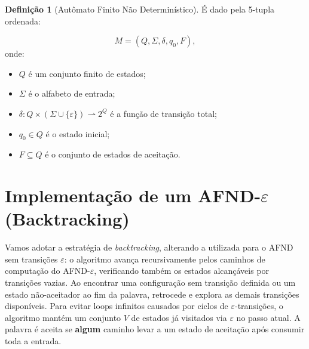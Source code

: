 \documentclass[12pt, a4paper]{article}
\theoremstyle{definition}
\newtheorem{definition}{Definição}[section]
\theoremstyle{plain}
\theoremstyle{remark}
\begin{document}
\begin{definition}[Autômato Finito Não Determinístico]
É dado pela 5-tupla ordenada:

\[
M = (Q, \Sigma, \delta, q_0, F),
\]
onde:

\begin{itemize}
    \item $Q$ é um conjunto finito de estados;
    \item $\Sigma$ é o alfabeto de entrada;
    \item $\delta : Q \times (\Sigma \cup \{\varepsilon\}) \rightharpoonup 2^{Q}$ é a função de transição total;
    \item $q_0 \in Q$ é o estado inicial;
    \item $F \subseteq Q$ é o conjunto de estados de aceitação.
\end{itemize}

\end{definition}

\section{Implementação de um AFND-$\varepsilon$ (Backtracking)}
Vamos adotar a estratégia de \textit{backtracking}, alterando a utilizada para
o AFND sem transições $\varepsilon$: o algoritmo avança recursivamente pelos
caminhos de computação do AFND-$\varepsilon$, verificando também os estados
alcançáveis por transições vazias. Ao encontrar uma configuração sem transição
definida ou um estado não-aceitador ao fim da palavra, retrocede e explora as
demais transições disponíveis. Para evitar loops infinitos causados por ciclos
de $\varepsilon$-transições, o algoritmo mantém um conjunto $V$ de estados já
visitados via $\varepsilon$ no passo atual. A palavra é aceita se \textbf{algum}
caminho levar a um estado de aceitação após consumir toda a entrada.
\end{document}
